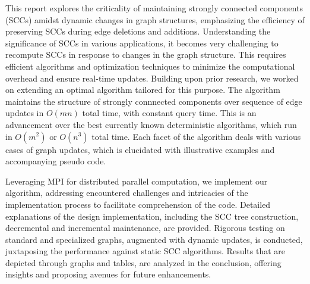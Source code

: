 This report explores the criticality of maintaining strongly connected components (SCCs) amidst dynamic changes in graph structures,
 emphasizing the efficiency of preserving SCCs during edge deletions and additions. Understanding the significance of SCCs in various applications,
 it becomes very challenging to recompute SCCs in response to changes in the graph structure. This requires efficient algorithms and optimization techniques
 to minimize the computational overhead and ensure real-time updates.
 Building upon prior research, we worked on extending an optimal algorithm tailored for this purpose. 
 The algorithm maintains the structure of strongly connnected components over sequence of edge updates in $O(mn)$ total time, with constant query time.
 This is an advancement over the best currently known deterministic algorithms, which run in $O(m^2)$ or $O(n^3)$ total time.
 Each facet of the algorithm deals with various cases of graph updates, which is elucidated with illustrative examples and accompanying pseudo code.
 
\vspace {1em}

Leveraging MPI for distributed parallel computation, we implement our algorithm,
 addressing encountered challenges and intricacies of the implementation process to facilitate comprehension of the code. 
 Detailed explanations of the design implementation, including the SCC tree construction, decremental and incremental maintenance, are provided.
 Rigorous testing on standard and specialized graphs, augmented with dynamic updates, is conducted, juxtaposing the performance against static SCC algorithms. 
 Results that are depicted through graphs and tables, are analyzed in the conclusion, offering insights and proposing avenues for future enhancements.